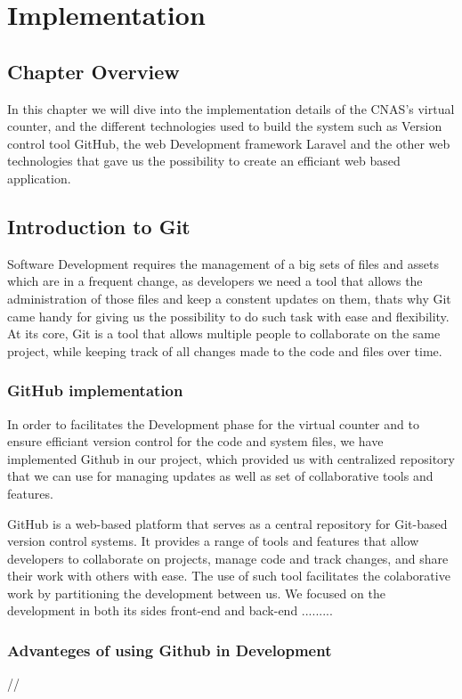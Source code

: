 \chapter{Implementation}
\section{Chapter Overview}
In this chapter we will dive into the implementation details of the CNAS's virtual counter, and the different technologies used to build the system such as Version control tool GitHub, the web Development framework Laravel and the other web technologies that gave us the possibility to create an efficiant web based application.
\section{Introduction to Git }
Software Development requires the management of a big sets of files and assets which are in a frequent change, as developers we need a tool that allows the administration of those files and keep a constent updates on them, thats why Git came handy for giving us the possibility to do such task with ease and flexibility. At its core, Git is a tool that allows multiple people to collaborate on the same project, while keeping track of all changes made to the code and files over time.
\subsection{GitHub implementation}
In order to facilitates the Development phase for the virtual counter and to ensure efficiant version control for the code and system files, we have implemented Github in our project, which provided us with centralized repository that we can use for managing updates as well as set of collaborative tools and features. 

\medskip GitHub is a web-based platform that serves as a central repository for Git-based version control systems. It provides a range of tools and features that allow developers to collaborate on projects, manage code and track changes, and share their work with others with ease. The use of such tool facilitates the colaborative work by partitioning the development between us. We focused on the development in both its sides front-end and back-end .........
\subsection{Advanteges of using Github in Development}
//
